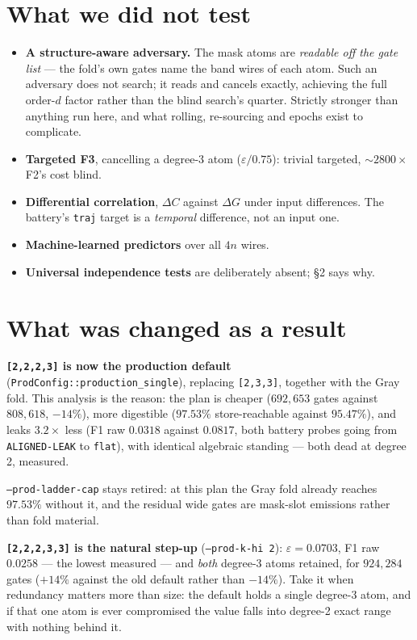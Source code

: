 \documentclass[11pt]{article}
\newcommand{\code}[1]{\texttt{#1}}
\begin{document}
\section{What we did not test}

\begin{itemize}
  \item \textbf{A structure-aware adversary.} The mask atoms are \emph{readable
        off the gate list} --- the fold's own gates name the band wires of each
        atom. Such an adversary does not search; it reads and cancels exactly,
        achieving the full order-$d$ factor rather than the blind search's
        quarter. Strictly stronger than anything run here, and what rolling,
        re-sourcing and epochs exist to complicate.
  \item \textbf{Targeted F3}, cancelling a degree-3 atom ($\varepsilon/0.75$):
        trivial targeted, ${\sim}2800\times$ F2's cost blind.
  \item \textbf{Differential correlation}, $\Delta C$ against $\Delta G$ under
        input differences. The battery's \code{traj} target is a \emph{temporal}
        difference, not an input one.
  \item \textbf{Machine-learned predictors} over all $4n$ wires.
  \item \textbf{Universal independence tests} are deliberately absent; \S2 says
        why.
\end{itemize}

\section{What was changed as a result}

\textbf{\code{[2,2,2,3]} is now the production default}
(\code{ProdConfig::production\_single}), replacing \code{[2,3,3]}, together with
the Gray fold. This analysis is the reason: the plan is cheaper
($692{,}653$ gates against $808{,}618$, \textbf{$-14\%$}), more digestible
($97.53\%$ store-reachable against $95.47\%$), and leaks $3.2\times$ less
(F1 raw $0.0318$ against $0.0817$, both battery probes going from
\code{ALIGNED-LEAK} to \code{flat}), with identical algebraic standing --- both
dead at degree 2, measured.

\code{--prod-ladder-cap} stays retired: at this plan the Gray fold already
reaches $97.53\%$ without it, and the residual wide gates are mask-slot
emissions rather than fold material.

\textbf{\code{[2,2,2,3,3]} is the natural step-up} (\code{--prod-k-hi 2}):
$\varepsilon = 0.0703$, F1 raw $0.0258$ --- the lowest measured --- and
\emph{both} degree-3 atoms retained, for $924{,}284$ gates ($+14\%$ against the
old default rather than $-14\%$). Take it when redundancy matters more than
size: the default holds a single degree-3 atom, and if that one atom is ever
compromised the value falls into degree-2 exact range with nothing behind it.
\end{document}
